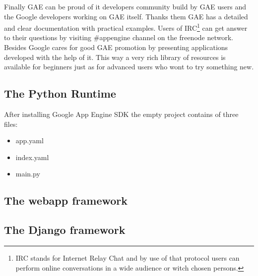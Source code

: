 Finally GAE can be proud of it developers community build by GAE users and the Google developers working on GAE itself. Thanks them GAE has a detailed and clear documentation with practical examples. Users of IRC\footnote{IRC stands for Internet Relay Chat and by use of that protocol users can perform online conversations in a wide audience or witch chosen persons.} can get answer to their questions by visiting \#appengine channel on the freenode network. Besides Google cares for good GAE promotion by presenting applications developed with the help of it. This way a very rich library of resources is available for beginners just as for advanced users who wont to try something new. 
  
  
\subsection{The Python Runtime}\label{sec:gae_py}
After installing Google App Engine SDK the empty project contains of three files:
\begin{itemize}
\item{app.yaml}
\item{index.yaml}
\item{main.py}
\end{itemize}
\subsection{The webapp framework}\label{sec:webapp}
\subsection{The Django framework}\label{sec:django}